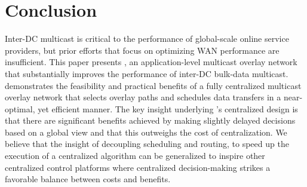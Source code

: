 \section{Conclusion}
Inter-DC multicast is critical to the performance of
global-scale online service providers, but
prior efforts that focus
on optimizing WAN performance are insufficient.
This paper presents \name,
an application-level multicast overlay network that substantially
improves the performance of
inter-DC bulk-data multicast.
\name demonstrates the feasibility
and practical benefits of a fully centralized multicast overlay
network that selects overlay paths and schedules data transfers
in a near-optimal, yet efficient manner.
The key insight underlying \name's centralized design is
that there are significant benefits achieved by making slightly delayed
decisions based on a global view and that this outweighs the cost of
centralization. %
We believe that the insight of decoupling scheduling and routing, to
speed up the execution of a centralized algorithm
can be generalized to inspire other centralized control platforms
where centralized decision-making strikes
a favorable balance between costs and benefits.

